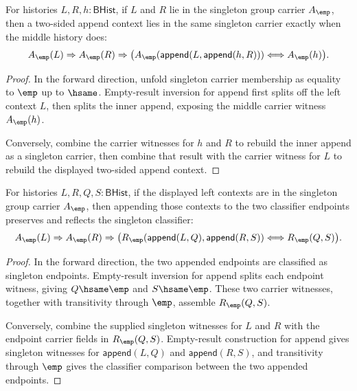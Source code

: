 \begin{theorem}
\label{thm:group-singleton-carrier-append-context-empty}
For histories $L,R,h:\mathsf{BHist}$, if $L$ and $R$ lie in the singleton
group carrier $A_{\emp}$, then a two-sided append context lies in the same
singleton carrier exactly when the middle history does:
$$
A_{\emp}(L)\Rightarrow A_{\emp}(R)\Rightarrow
\bigl(
A_{\emp}(\mathsf{append}(L,\mathsf{append}(h,R)))
\Longleftrightarrow A_{\emp}(h)
\bigr).
$$
\end{theorem}
\begin{proof}
In the forward direction, unfold singleton carrier membership as equality to
$\emp$ up to $\hsame$. Empty-result inversion for append first splits off the
left context $L$, then splits the inner append, exposing the middle carrier
witness $A_{\emp}(h)$.

Conversely, combine the carrier witnesses for $h$ and $R$ to rebuild the inner
append as a singleton carrier, then combine that result with the carrier
witness for $L$ to rebuild the displayed two-sided append context.
\end{proof}

\begin{theorem}
\label{thm:group-singleton-classifier-append-context-cancel}
For histories $L,R,Q,S:\mathsf{BHist}$, if the displayed left contexts are in
the singleton group carrier $A_{\emp}$, then appending those contexts to the
two classifier endpoints preserves and reflects the singleton classifier:
$$
A_{\emp}(L)\Rightarrow A_{\emp}(R)\Rightarrow
\bigl(
R_{\emp}(\mathsf{append}(L,Q),\mathsf{append}(R,S))
\Longleftrightarrow
R_{\emp}(Q,S)
\bigr).
$$
\end{theorem}
\begin{proof}
In the forward direction, the two appended endpoints are classified as
singleton endpoints. Empty-result inversion for append splits each endpoint
witness, giving $Q\hsame\emp$ and $S\hsame\emp$. These two carrier witnesses,
together with transitivity through $\emp$, assemble $R_{\emp}(Q,S)$.

Conversely, combine the supplied singleton witnesses for $L$ and $R$ with the
endpoint carrier fields in $R_{\emp}(Q,S)$. Empty-result construction for
append gives singleton witnesses for $\mathsf{append}(L,Q)$ and
$\mathsf{append}(R,S)$, and transitivity through $\emp$ gives the classifier
comparison between the two appended endpoints.
\end{proof}

